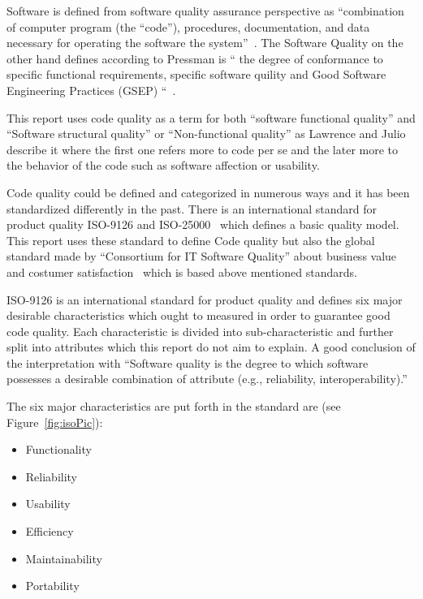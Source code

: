 Software is defined from software quality assurance perspective as “combination of computer program (the “code”), procedures, documentation, and data necessary for operating the software the system”~\cite{Galin}. The Software Quality on the other hand defines according to Pressman is “ the degree of conformance to specific functional requirements, specific software quility and Good Software Engineering Practices (GSEP) “~\cite{Pressman}.

This report uses code quality as a term for both “software functional quality” and “Software structural quality” or “Non-functional quality” as Lawrence and Julio~\cite{Chung} describe it where the first one refers more to code per se and the later more to the behavior of the code such as software affection or usability. 

Code quality could be defined and categorized in numerous ways and it has been standardized differently in the past. There is an international standard for product quality ISO-9126 and ISO-25000~\cite{ISO9126}  which defines a basic quality model. This report uses these standard to define Code quality but also the global standard made by “Consortium for IT Software Quality” about business value and costumer satisfaction~\cite{cisq} which is based above mentioned standards. 

ISO-9126 is an international standard for product quality and defines six major desirable characteristics which ought to measured in order to guarantee good code quality. Each characteristic is divided into sub-characteristic and further split into attributes which this report do not aim to explain. A good conclusion of the interpretation with 
“Software quality is the degree to which software possesses a desirable combination of attribute (e.g., reliability, interoperability).”~\cite{ISO1061}

The six major characteristics are put forth in the standard are (see Figure~\ref{fig:isoPic}): 
\begin{itemize}
\item Functionality 
\item Reliability
\item Usability
\item Efficiency
\item Maintainability
\item Portability
\end{itemize}